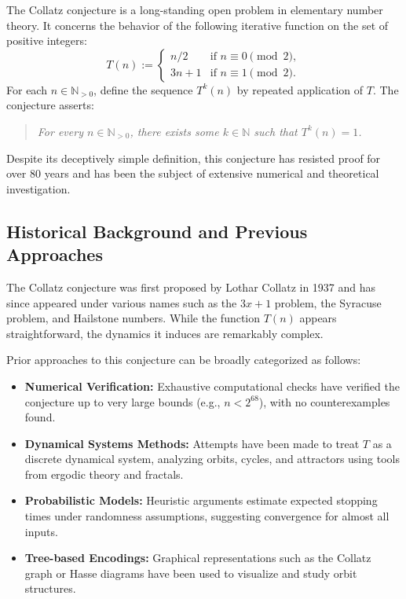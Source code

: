 \documentclass[11pt]{article}
\begin{document}
The Collatz conjecture is a long-standing open problem in elementary number theory. It concerns the behavior of the following iterative function on the set of positive integers:
\[
T(n) := 
\begin{cases}
n/2 & \text{if } n \equiv 0 \pmod{2}, \\
3n + 1 & \text{if } n \equiv 1 \pmod{2}.
\end{cases}
\]
For each \( n \in \mathbb{N}_{>0} \), define the sequence \( T^k(n) \) by repeated application of \( T \). The conjecture asserts:
\begin{quote}
\emph{For every \( n \in \mathbb{N}_{>0} \), there exists some \( k \in \mathbb{N} \) such that \( T^k(n) = 1 \).}
\end{quote}
Despite its deceptively simple definition, this conjecture has resisted proof for over 80 years and has been the subject of extensive numerical and theoretical investigation.

\subsection{Historical Background and Previous Approaches}

The Collatz conjecture was first proposed by Lothar Collatz in 1937 and has since appeared under various names such as the \(3x+1\) problem, the Syracuse problem, and Hailstone numbers. While the function \( T(n) \) appears straightforward, the dynamics it induces are remarkably complex.

Prior approaches to this conjecture can be broadly categorized as follows:

\begin{itemize}
  \item \textbf{Numerical Verification:} Exhaustive computational checks have verified the conjecture up to very large bounds (e.g., \( n < 2^{68} \)), with no counterexamples found.
  
  \item \textbf{Dynamical Systems Methods:} Attempts have been made to treat \( T \) as a discrete dynamical system, analyzing orbits, cycles, and attractors using tools from ergodic theory and fractals.

  \item \textbf{Probabilistic Models:} Heuristic arguments estimate expected stopping times under randomness assumptions, suggesting convergence for almost all inputs.

  \item \textbf{Tree-based Encodings:} Graphical representations such as the Collatz graph or Hasse diagrams have been used to visualize and study orbit structures.
\end{itemize}
\end{document}
